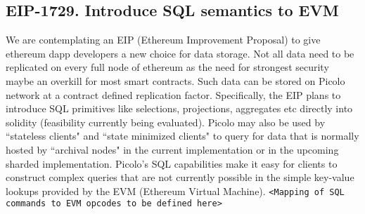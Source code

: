 \newpage

\begin{appendices}

\section{EIP-1729. Introduce SQL semantics to EVM }
We are contemplating an EIP (Ethereum Improvement Proposal) to give ethereum dapp developers a new choice for data storage. Not all data need to be replicated on every full node of ethereum as the need for strongest security maybe an overkill for most smart contracts. Such data can be stored on Picolo network at a contract defined replication factor. Specifically, the EIP plans to introduce SQL primitives like selections, projections, aggregates etc directly into solidity (feasibility currently being evaluated).
\newline
\newline
Picolo may also be used by ``stateless clients" and ``state minimized clients" to query for data that is normally hosted by ``archival nodes" in the current implementation or in the upcoming sharded implementation. Picolo's SQL capabilities make it easy for clients to construct complex queries that are not currently possible in the simple key-value lookups provided by the EVM (Ethereum Virtual Machine).
\newline\newline
\texttt{<Mapping of SQL commands to EVM opcodes to be defined here>}
\end{appendices}
